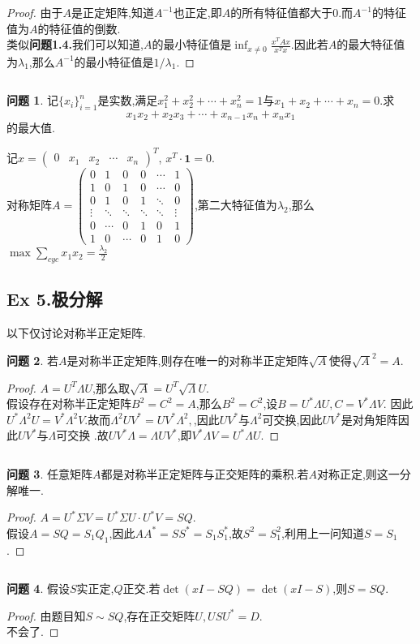 \documentclass[11pt]{ctexart}
\theoremstyle{definition}
\newtheorem{qqq}{问题}[section]
\numberwithin{equation}{section}
\begin{document}
\begin{proof}
    由于$A$是正定矩阵,知道$A^{-1}$也正定,即$A$的所有特征值都大于0.而$A^{-1}$的特征值为$A$的特征值的倒数.\\
    类似\textbf{问题1.4.}我们可以知道,$A$的最小特征值是$\inf_{x\neq 0}\frac{x^TAx}{x^Tx}$.因此若$A$的最大特征值为$\lambda_1$,那么$A^{-1}$的最小特征值是$1/\lambda_1$.
\end{proof}
\[{}\]
\begin{qqq}
    记$\{x_i\}^n_{i=1}$是实数,满足$x_1^2+x_2^2+\cdots+x_n^2=1$与$x_1+x_2+\cdots+x_n=0$.求\[x_1x_2+x_2x_3+\cdots+x_{n-1}x_n+x_nx_1\]
    的最大值.
\end{qqq}
\begin{aaa}
    记$x=\begin{pmatrix}
        0&x_1&x_2&\cdots&x_n
    \end{pmatrix}^T$, $x^T\cdot\textbf{1}=0.$\\
    对称矩阵$A=\begin{pmatrix}
        0&1&0&0&\cdots&1\\
        1&0&1&0&\cdots&0\\
        0&1&0&1&\ddots&0\\
        \vdots&\ddots&\ddots&\ddots&\ddots&\vdots\\
        0&\cdots&0&1&0&1\\
        1&0&\cdots&0&1&0
    \end{pmatrix}$,第二大特征值为$\lambda_2$,那么$\max \sum \limits_{cyc}x_1x_2=\frac{\lambda_2}{2}$
\end{aaa}
\newpage
\subsection{Ex 5.极分解}以下仅讨论对称半正定矩阵.
\begin{qqq}
    若$A$是对称半正定矩阵,则存在唯一的对称半正定矩阵$\sqrt{A}$使得$\sqrt{A}^2=A$.
\end{qqq}
\begin{proof}
    $A=U^T\Lambda U$,那么取$\sqrt{A}=U^T\sqrt{\Lambda}U$.\\
    假设存在对称半正定矩阵$B^2=C^2=A$,那么$B^2=C^2$,设$B=U^*\Lambda U,C=V^*\Lambda V.$ 因此$U^*\Lambda^2U=V^*\Lambda^2V$.故而$\Lambda^2UV^*=UV^*\Lambda^2,$,因此$UV^*$与$\Lambda^2$可交换,因此$UV^*$是对角矩阵因此$UV^*$与$\Lambda$可交换    .故$UV^*\Lambda=\Lambda UV^*$,即$V^*\Lambda V=U^*\Lambda U$. 
\end{proof}
\[{}\]
\begin{qqq}
    任意矩阵$A$都是对称半正定矩阵与正交矩阵的乘积.若$A$对称正定,则这一分解唯一.
\end{qqq}
\begin{proof}
    $A=U^*\Sigma V=U^*\Sigma U\cdot U^*V=SQ$.\\
    假设$A=SQ=S_1Q_1$,因此$AA^*=SS^*=S_1S_1^*$,故$S^2=S_1^2$,利用上一问知道$S=S_1$.
\end{proof}\[{}\]
\begin{qqq}
    假设$S$实正定,$Q$正交.若$\det(xI-SQ)=\det(xI-S)$,则$S=SQ$.
\end{qqq}
\begin{proof}
    由题目知$S \sim SQ$,存在正交矩阵$U,USU^*=D$.\\
    不会了.
\end{proof}
\newpage
\end{document}
